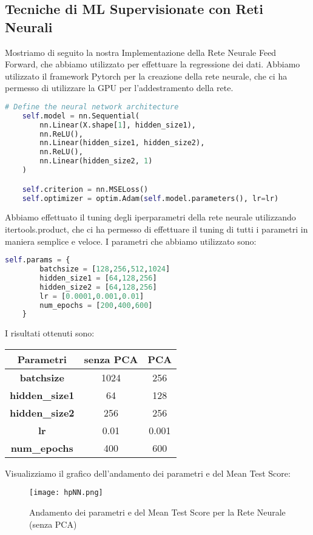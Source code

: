 \documentclass[../../Report.tex]{subfiles}
\begin{document}
\subsection{Tecniche di ML Supervisionate con Reti Neurali}
Mostriamo di seguito la nostra Implementazione della Rete Neurale Feed Forward, che abbiamo utilizzato per effettuare la regressione dei dati.
Abbiamo utilizzato il framework Pytorch per la creazione della rete neurale, che ci ha permesso di utilizzare la GPU per l'addestramento della rete.

\begin{lstlisting}[language=python]
    # Define the neural network architecture
    self.model = nn.Sequential(
        nn.Linear(X.shape[1], hidden_size1),
        nn.ReLU(),
        nn.Linear(hidden_size1, hidden_size2),
        nn.ReLU(),
        nn.Linear(hidden_size2, 1)
    )

    self.criterion = nn.MSELoss()
    self.optimizer = optim.Adam(self.model.parameters(), lr=lr)

\end{lstlisting}

Abbiamo effettuato il tuning degli iperparametri della rete neurale utilizzando itertools.product, che ci ha permesso di effettuare il tuning di tutti i parametri in maniera semplice e veloce.
I parametri che abbiamo utilizzato sono:
\begin{lstlisting}[language=python]
    self.params = {
        batchsize = [128,256,512,1024]	
        hidden_size1 = [64,128,256]
        hidden_size2 = [64,128,256]
        lr = [0.0001,0.001,0.01]
        num_epochs = [200,400,600]
    }
\end{lstlisting}
I risultati ottenuti sono:
\begin{table}[H]
    \centering
    \begin{tabular}{|c|c|c|}
    \hline
    \textbf{Parametri} & \textbf{senza PCA} & \textbf{PCA} \\ \hline
    \textbf{batchsize}& 1024 & 256\\
    \textbf{hidden\_size1}& 64 &  128 \\
    \textbf{hidden\_size2}& 256 & 256\\
    \textbf{lr}& 0.01 &  0.001\\
    \textbf{num\_epochs}& 400 & 600\\
    \hline
\end{tabular}
\end{table}

Visualizziamo il grafico dell'andamento dei parametri e del Mean Test Score:
\begin{figure}[H]
    \centering
    \texttt{[image: hpNN.png]}
    \caption{Andamento dei parametri e del Mean Test Score per la Rete Neurale (senza PCA)}
\end{figure}
\end{document}
